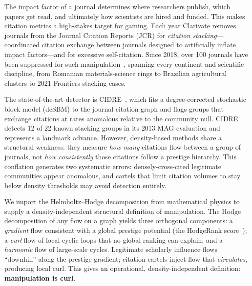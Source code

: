 \documentclass[twocolumn,11pt,letterpaper]{article}
\begin{document}
The impact factor of a journal determines where researchers publish, which
papers get read, and ultimately how scientists are hired and funded. This makes
citation metrics a high-stakes target for gaming. Each year Clarivate removes
journals from the Journal Citation Reports (JCR) for \emph{citation
stacking}---coordinated citation exchange between journals designed to
artificially inflate impact factors---and for excessive self-citation. Since
2018, over 100 journals have been suppressed for such manipulation~\cite{JCRData2022},
spanning every continent and scientific discipline, from Romanian
materials-science rings to Brazilian agricultural clusters to 2021 Frontiers
stacking cases.

The state-of-the-art detector is CIDRE~\cite{Kojaku2020}, which fits a
degree-corrected stochastic block model (dcSBM) to the journal citation graph
and flags groups that exchange citations at rates anomalous relative to the
community null. CIDRE detects 12 of 22 known stacking groups in its 2013 MAG
evaluation and represents a landmark advance. However, density-based methods
share a structural weakness: they measure \emph{how many} citations flow
between a group of journals, not \emph{how consistently} those citations
follow a prestige hierarchy. This conflation generates two systematic errors:
densely-cross-cited legitimate communities appear anomalous, and cartels that
limit citation volumes to stay below density thresholds may avoid detection
entirely.

We import the Helmholtz--Hodge decomposition from mathematical physics to
supply a density-independent structural definition of manipulation. The Hodge
decomposition of any flow on a graph yields three orthogonal components: a
\emph{gradient} flow consistent with a global prestige potential (the
HodgeRank score~\cite{Jiang2008}); a \emph{curl} flow of local cyclic loops
that no global ranking can explain; and a \emph{harmonic} flow of large-scale
cycles. Legitimate scholarly influence flows ``downhill'' along the prestige
gradient; citation cartels inject flow that \emph{circulates}, producing local
curl. This gives an operational, density-independent definition:
\textbf{manipulation is curl}.
\end{document}
